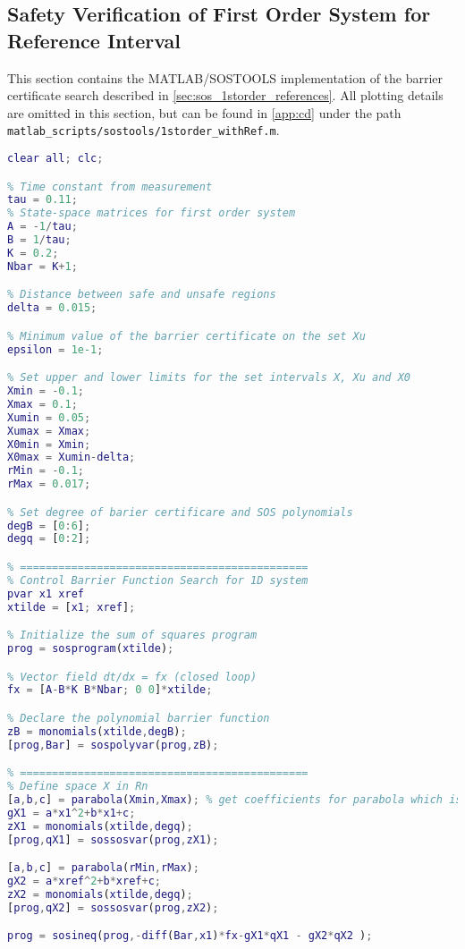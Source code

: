 \subsection{Safety Verification of First Order System for Reference Interval}\label{app:sos_refinterval}
This section contains the MATLAB/SOSTOOLS implementation of the barrier certificate search described in \autoref{sec:sos_1storder_references}. All plotting details are omitted in this section, but can be found in \autoref{app:cd} under the path \texttt{matlab\_scripts/sostools/1storder\_withRef.m}.

\begin{lstlisting}[language=matlab]
% 1D system WITH REFERENCE INTERVAL
clear all; clc; 

% Time constant from measurement
tau = 0.11;
% State-space matrices for first order system
A = -1/tau;
B = 1/tau;
K = 0.2;
Nbar = K+1;

% Distance between safe and unsafe regions
delta = 0.015;

% Minimum value of the barrier certificate on the set Xu
epsilon = 1e-1;

% Set upper and lower limits for the set intervals X, Xu and X0
Xmin = -0.1;
Xmax = 0.1;
Xumin = 0.05;
Xumax = Xmax;
X0min = Xmin;
X0max = Xumin-delta;
rMin = -0.1;
rMax = 0.017;

% Set degree of barier certificare and SOS polynomials
degB = [0:6];
degq = [0:2];

% =============================================
% Control Barrier Function Search for 1D system
pvar x1 xref
xtilde = [x1; xref];

% Initialize the sum of squares program
prog = sosprogram(xtilde);

% Vector field dt/dx = fx (closed loop)
fx = [A-B*K B*Nbar; 0 0]*xtilde;

% Declare the polynomial barrier function
zB = monomials(xtilde,degB);
[prog,Bar] = sospolyvar(prog,zB);

% =============================================
% Define space X in Rn
[a,b,c] = parabola(Xmin,Xmax); % get coefficients for parabola which is positive for x in [-0.1,0.1]
gX1 = a*x1^2+b*x1+c;
zX1 = monomials(xtilde,degq);
[prog,qX1] = sossosvar(prog,zX1);

[a,b,c] = parabola(rMin,rMax); 
gX2 = a*xref^2+b*xref+c;
zX2 = monomials(xtilde,degq);
[prog,qX2] = sossosvar(prog,zX2);

prog = sosineq(prog,-diff(Bar,x1)*fx-gX1*qX1 - gX2*qX2 );


\end{lstlisting}

